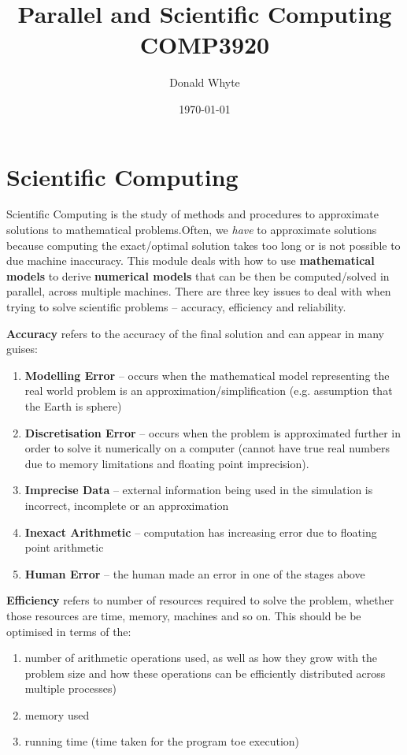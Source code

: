 \documentclass{article}
\title{Parallel and Scientific Computing \\ COMP3920}
\author{Donald Whyte}
\date{\today}
\begin{document}
\maketitle

\pagebreak
\tableofcontents

\pagebreak
\listoffigures

\pagebreak
\listoftables

\pagebreak

\section{Scientific Computing}

Scientific Computing is the study of methods and procedures to approximate solutions to mathematical problems.Often, we \textit{have} to approximate solutions because computing the exact/optimal solution takes too long or is not possible to due machine inaccuracy. This module deals with how to use \textbf{mathematical models} to derive \textbf{numerical models} that can be then be computed/solved in parallel, across multiple machines. There are three key issues to deal with when trying to solve scientific problems -- accuracy, efficiency and reliability.

\textbf{Accuracy} refers to the accuracy of the final solution and can appear in many guises:
\begin{enumerate}
	\item \textbf{Modelling Error} -- occurs when the mathematical model representing the real world problem is an approximation/simplification (e.g. assumption that the Earth is  sphere)
	\item \textbf{Discretisation Error} -- occurs when the problem is approximated further in order to solve it numerically on a computer (cannot have true real numbers  due to memory limitations and floating point imprecision).
	\item \textbf{Imprecise Data} -- external information being used in the simulation is incorrect, incomplete or an approximation
	\item \textbf{Inexact Arithmetic} -- computation has increasing error due to floating point arithmetic
	\item \textbf{Human Error} -- the human made an error in one of the stages above
\end{enumerate}

\textbf{Efficiency} refers to number of resources required to solve the problem, whether those resources are time, memory, machines and so on. This should be be optimised in terms of the:
\begin{enumerate}
	\item number of arithmetic operations used, as well as how they grow with the problem size and how these operations can be efficiently distributed across multiple processes)
	\item memory used
	\item running time (time taken for the program toe execution)
\end{enumerate}
\end{document}
